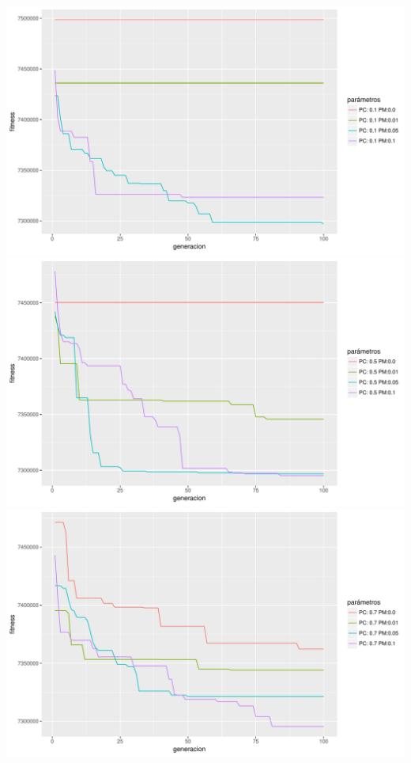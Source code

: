\documentclass[10pt,a4paper]{article}
\begin{document}
\includegraphics[width = \textwidth]{img/graphics/GAlamarckPC01.pdf}
\includegraphics[width = \textwidth]{img/graphics/GAlamarckPC05.pdf}
\includegraphics[width = \textwidth]{img/graphics/GAlamarckPC07.pdf}
\end{document}
